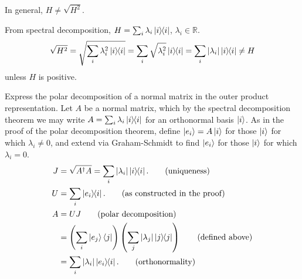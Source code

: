 \begin{screen}
	In general, $H \neq \sqrt{H^2}$.

	From spectral decomposition, $H = \sum_i \lambda_i \ket{i}\hspace{-1mm} \bra{i}$, $\lambda_i \in \mathds{R}$.
	\begin{align*}
		 \sqrt{H^2} = \sqrt{ \sum_i \lambda_i^2 \ket{i}\hspace{-1mm} \bra{i} }
		 =
 		\sum_i
 			\sqrt{
 				\lambda_i^2
			} \ket{i}\hspace{-1mm} \bra{i}
		= \sum_i | \lambda_i | \ket{i}\hspace{-1mm} \bra{i} \neq H
	\end{align*}
unless $H$ is positive.
\end{screen}


 Express the polar decomposition of a normal matrix in the outer product representation.
\Soln
Let $A$ be a normal matrix, which by the spectral decomposition theorem we may write $A = \sum_i \lambda_i \ket{i}\hspace{-1mm} \bra{i}$ for an orthonormal basis $\ket{i}$.  As in the proof of the polar decomposition theorem, define $\ket{e_i} = A\ket{i}$ for those $\ket{i}$  for which $\lambda_i\neq 0$, and extend via Graham-Schmidt to find $\ket{e_i}$ for those $\ket{i}$ for which $\lambda_i=0$.    
\begin{align*}
	J &= \sqrt{A^\dagger A} = \sum_i | \lambda_i | \ket{i}\hspace{-1mm} \bra{i}. \tag{uniqueness}\\
	U &= \sum_i \ket{e_i}\hspace{-1mm} \bra{i}.\tag{as constructed in the proof}\\
	A &= UJ \tag{polar decomposition} \\
	  &= \left(\sum_i \ket{e_j}\bra{j}\right)\left(\sum_j |\lambda_j|\ket{j}\hspace{-1mm} \bra{j}\right) \tag{defined above} \\ 
	  &= \sum_i |\lambda_i| \ket{e_i}\hspace{-1mm} \bra{i}. \tag{orthonormality}
\end{align*}



